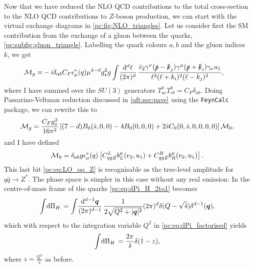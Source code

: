 \documentclass[../main.tex]{subfiles}
\begin{document}
Now that we have reduced the NLO QCD contributions to the total cross-section to the NLO QCD contributions to \(Z\)-boson production, we can start with the virtual exchange diagrams in \cref{pc:fig:NLO_triangles}.
Let us consider first the SM contribution from the exchange of a gluon between the quarks, \cref{pc:subfig:gluon_triangle}.
Labelling the quark colours \(a, b\) and the gluon indices \(k\), we get
\begin{align}
  \M_g = & -i\delta_{ab} C_F \epsilon_\mu^\ast(q) \mu^{4-d} g_s^2 g \loopintegral[d]{\ell} \frac{\bar{v}_2 \gamma^\nu (\slashed{p}-\slashed{k}_j) \gamma^\mu (\slashed{p}+\slashed{k}_i) \gamma_\nu u_1}{\ell^2(\ell+k_i)^2(\ell-k_j)^2},
\end{align}
where I have summed over the \(SU(3)\) generators \(T_{ac}^k T_{cb}^k = C_F \delta_{ab}\).
Doing Passarino-Veltman reduction discussed in \cref{qft:sec:pave} using the \verb|FeynCalc|~\cite{FeynCalc1,FeynCalc2,FeynCalc3,FeynCalc4} package, we can rewrite this to
\begin{equation}
  \M_g = \frac{C_F g_s^2}{16\pi^2} \bclosed{(7-d)B_0(\hat{s},0,0) - 4B_0(0,0,0) + 2\hat{s}C_0(0,\hat{s},0,0,0,0)} \M_0,
\end{equation}
and I have defined
\begin{equation}
  \label{pc:eq:LO_qq_Z}
  \M_0 = \delta_{ab} g \epsilon_\mu^\ast(q) \bclosed{C_{qqZ}^L b_L^\mu(v_2, u_1) + C_{qqZ}^R b_R^\mu(v_2, u_1)}.
\end{equation}
This last bit \cref{pc:eq:LO_qq_Z} is recognisable as the tree-level amplitude for \(q\bar{q} \to Z^\ast\).
The phase space is simpler in this case without any real emission: In the centre-of-mass frame of the quarks \cref{pc:eq:dPi_H_2to1} becomes
\begin{equation}
  \integral{\Pi_H} = \loopintegral[d-1]{\vec{q}} \frac{1}{2\sqrt{Q^2+|\vec{q}|^2}} (2\pi)^d \delta(Q - \sqrt{\hat{s}}) \delta^{d-1}(\vec{q}),
\end{equation}
which with respect to the integration variable \(Q^2\) in \cref{pc:eq:dPi_factorised} yields
\begin{equation}
  \integral{\Pi_H} = \frac{2\pi}{\hat{s}} \delta(1-z),
\end{equation}
where \(z = \frac{Q^2}{\hat{s}}\) as before.
\end{document}
